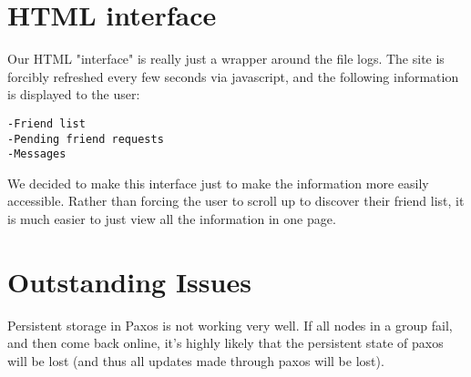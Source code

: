 \documentclass[11pt]{article}
\begin{document}
\section{HTML interface}

Our HTML "interface" is really just a wrapper around the file logs. The site is forcibly refreshed every few seconds via javascript, and the following information is displayed to the user:

\begin{verbatim}
-Friend list
-Pending friend requests
-Messages
\end{verbatim}

We decided to make this interface just to make the information more easily accessible. Rather than forcing the user to scroll up to discover their friend list, it is much easier to just view all the information in one page. 

\section{Outstanding Issues}

Persistent storage in Paxos is not working very well. If all nodes in a group fail, and then come back online, it's highly likely that the persistent state of paxos will be lost (and thus all updates made through paxos will be lost). 
\end{document}
